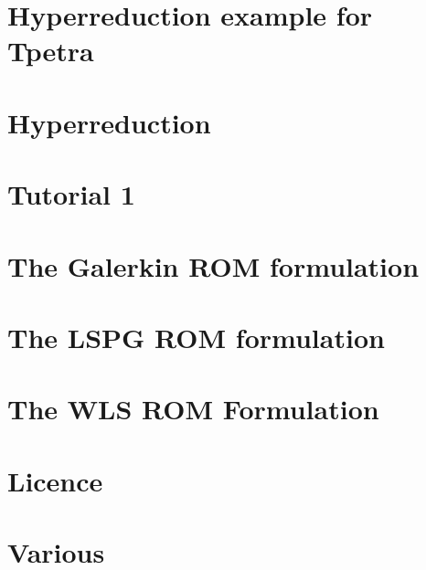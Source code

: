 \let\mypdfximage\pdfximage\def\pdfximage{\immediate\mypdfximage}\documentclass[twoside]{book}
\newcommand{\+}{\discretionary{\mbox{\scriptsize$\hookleftarrow$}}{}{}}
\newcommand{\clearemptydoublepage}{%
  \newpage{\pagestyle{empty}\cleardoublepage}%
}
\begin{document}
\chapter{Hyperreduction example for Tpetra}
\label{md_pages_hyperreduction_hyperred_tpetra_example}

\chapter{Hyperreduction}
\label{md_pages_hyperreduction}

\chapter{Tutorial 1}
\label{md_pages_tutorials_tutorial1}

\chapter{The Galerkin R\+OM formulation}
\label{md_pages_various_formulation_galerkin}

\chapter{The L\+S\+PG R\+OM formulation}
\label{md_pages_various_formulation_lspg}

\chapter{The W\+LS R\+OM Formulation}
\label{md_pages_various_formulation_wls}

\chapter{Licence}
\label{md_pages_various_license}

\chapter{Various}
\label{md_pages_various}


\backmatter
\newpage
{}
\clearemptydoublepage
{}
\printindex
\end{document}
